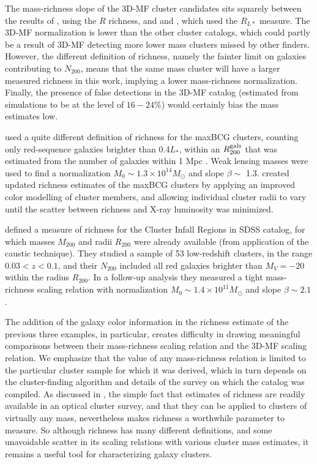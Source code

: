 The mass-richness slope of the \ac{3D-MF} cluster candidates sits squarely between the results of \citet{Wen09}, using the $R$ richness, and \citet{Wen12} and \citet{Covone14}, which used the $R_{L*}$ measure. The \ac{3D-MF} normalization is lower than the other cluster catalogs, which could partly be a result of \ac{3D-MF} detecting more lower mass clusters missed by other finders. However, the different definition of richness, namely the fainter limit on galaxies contributing to $N_{200}$, means that the same mass cluster will have a larger measured richness in this work, implying a lower mass-richness normalization. Finally, the presence of false detections in the \ac{3D-MF} catalog (estimated from simulations to be at the level of $16-24$\%) would certainly bias the mass estimates low.

\citet{Johnston07} used a quite different definition of richness for the maxBCG clusters, counting only red-sequence galaxies brighter than 0.4$L_*$, within an $R_{200}^{\rm gals}$ that was estimated from the number of galaxies within 1 Mpc \citep[following a prescription in][]{Hansen05}. Weak lensing masses were used to find a normalization $M_0 \sim 1.3 \times 10^{14} M_{\odot}$ and slope $\beta \sim$ 1.3. \citet{Rozo09b} created updated richness estimates of the maxBCG clusters by applying an improved color modelling of cluster members, and allowing individual cluster radii to vary until the scatter between richness and X-ray luminosity was minimized.

\citet{Andreon10} defined a measure of richness for the Cluster Infall Regions in SDSS catalog, for which masses $M_{200}$ and radii $R_{200}$ were already available (from application of the caustic technique). They studied a sample of 53 low-redshift clusters, in the range $0.03 < z < 0.1$, and their $N_{200}$ included all red galaxies brighter than $M_V = -20$ within the radius $R_{200}$. In a follow-up analysis they measured a tight mass-richness scaling relation with normalization $M_0 \sim 1.4 \times 10^{11} M_{\odot}$ and slope $\beta \sim 2.1$ \citep{Andreon12}.

The addition of the galaxy color information in the richness estimate of the previous three examples, in particular, creates difficulty in drawing meaningful comparisons between their mass-richness scaling relation and the \ac{3D-MF} scaling relation. We emphasize that the value of any mass-richness relation is limited to the particular cluster sample for which it was derived, which in turn depends on the cluster-finding algorithm and details of the survey on which the catalog was compiled. As discussed in \citet{Rozo09b}, the simple fact that estimates of richness are readily available in an optical cluster survey, and that they can be applied to clusters of virtually any mass, nevertheless makes richness a worthwhile parameter to measure. So although richness has many different definitions, and some unavoidable scatter in its scaling relations with various cluster mass estimates, it remains a useful tool for characterizing galaxy clusters. 

